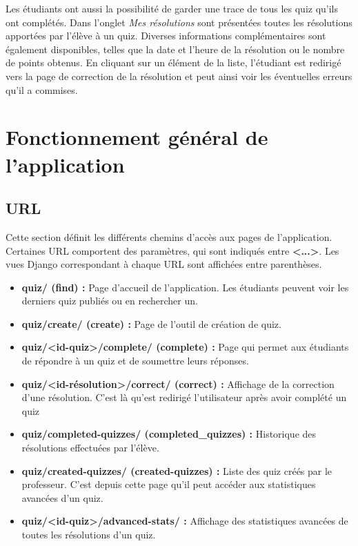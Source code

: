 \documentclass[a4,10pt,french]{sphinxmanual}
\begin{document}
Les étudiants ont aussi la possibilité de garder une trace de tous les quiz qu'ils ont complétés. Dans l'onglet \emph{Mes résolutions} sont présentées toutes les résolutions apportées par l'élève à un quiz. Diverses informations complémentaires sont également disponibles, telles que la date et l'heure de la résolution ou le nombre de points obtenus. En cliquant sur un élément de la liste, l'étudiant est redirigé vers la page de correction de la résolution et peut ainsi voir les éventuelles erreurs qu'il a commises.


\chapter{Fonctionnement général de l'application}
\label{global::doc}\label{global:fonctionnement-general-de-l-application}

\section{URL}
\label{global:url}
Cette section définit les différents chemins d'accès aux pages de l'application. Certaines URL comportent des paramètres,
qui sont indiqués entre \textbf{\textless{}...\textgreater{}}. Les vues Django correspondant à chaque URL sont affichées entre parenthèses.
\begin{itemize}
\item {} 
\textbf{quiz/ (find) :} Page d'accueil de l'application. Les étudiants peuvent voir les derniers quiz publiés ou en rechercher un.

\item {} 
\textbf{quiz/create/ (create) :} Page de l'outil de création de quiz.

\item {} 
\textbf{quiz/\textless{}id-quiz\textgreater{}/complete/ (complete) :} Page qui permet aux étudiants de répondre à un quiz et de soumettre leurs réponses.

\item {} 
\textbf{quiz/\textless{}id-résolution\textgreater{}/correct/ (correct) :} Affichage de la correction d'une résolution. C'est là qu'est redirigé l'utilisateur après avoir complété un quiz

\item {} 
\textbf{quiz/completed-quizzes/ (completed\_quizzes) :} Historique des résolutions effectuées par l'élève.

\item {} 
\textbf{quiz/created-quizzes/ (created-quizzes) :} Liste des quiz créés par le professeur. C'est depuis cette page qu'il peut accéder aux statistiques avancées d'un quiz.

\item {} 
\textbf{quiz/\textless{}id-quiz\textgreater{}/advanced-stats/ :} Affichage des statistiques avancées de toutes les résolutions d'un quiz.

\end{itemize}
\end{document}
